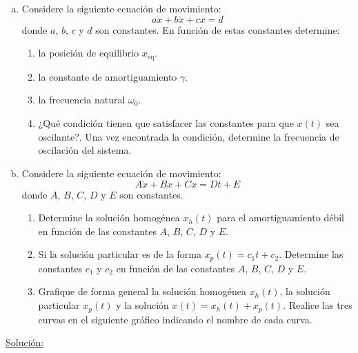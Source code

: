 \item 
	\begin{enumerate}[a)]
		\item Considere la siguiente ecuación de movimiento:
		\begin{equation*}
			a \ddot{x} + b \dot{x} + cx = d
		\end{equation*}
		donde $a$, $b$, $c$ y $d$ son constantes. En función de estas constantes determine:
		\begin{enumerate}
			\item la posición de equilibrio $x_{\text{eq}}$.
					
			\item la constante de amortiguamiento $\gamma$.
			
			\item la frecuencia natural $\omega_0$.
			
			\item ¿Qué condición tienen que satisfacer las constantes para que $x(t)$ sea oscilante?. Una vez encontrada la condición, determine la frecuencia de oscilación del sistema.
		\end{enumerate}
		
		\bigskip
		
		\item Considere la siguiente ecuación de movimiento:
		\begin{equation*}
			A \ddot{x} + B \dot{x} + Cx = Dt + E
		\end{equation*}
		donde $A$, $B$, $C$, $D$ y $E$ son constantes.
		\begin{enumerate}
			\item Determine la solución homogénea $x_h(t)$ para el amortiguamiento débil en función de las constantes $A$, $B$, $C$, $D$ y $E$.
			
			\item Si la solución particular es de la forma $x_p(t) = c_1 t + c_2$. Determine las constantes $c_1$ y $c_2$ en función de las constantes $A$, $B$, $C$, $D$ y $E$.
			
			\item Grafique de forma general la solución homogénea $x_h(t)$, la solución particular $x_p(t)$ y la solución $x(t) = x_h(t) + x_p(t)$. Realice las tres curvas en el siguiente gráfico indicando el nombre de cada curva.
		\end{enumerate}
	\end{enumerate}

\underline{Soluci\'on:}

